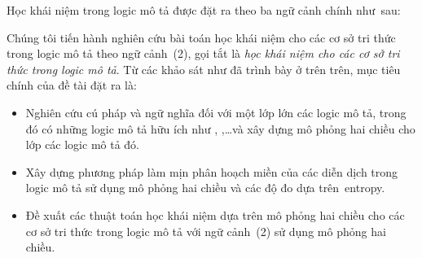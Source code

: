 Học khái niệm trong logic mô tả được đặt ra theo ba ngữ cảnh chính như~sau:\\[0.5ex]
%

Chúng tôi tiến hành nghiên cứu bài toán học khái niệm cho các cơ sở tri thức trong logic mô tả theo ngữ cảnh~(2), gọi tắt là {\em học khái niệm cho các cơ sở tri thức trong logic mô tả}. Từ các khảo sát như đã trình bày ở trên trên, mục tiêu chính của đề tài đặt ra là:
\begin{itemize}
	\item Nghiên cứu cú pháp và ngữ nghĩa đối với một lớp lớn các logic mô tả, trong đó có những logic mô tả hữu ích như \SHOIQ, \SROIQ,\ldots và xây dựng mô phỏng hai chiều cho lớp các logic mô tả đó.

	\item Xây dựng phương pháp làm mịn phân hoạch miền của các diễn dịch trong logic mô tả sử dụng mô phỏng hai chiều và các độ đo dựa trên~entropy.
	
	\item Đề xuất các thuật toán học khái niệm dựa trên mô phỏng hai chiều cho các cơ sở tri thức trong logic mô tả với ngữ cảnh~(2) sử dụng mô phỏng hai chiều.
\end{itemize}
\cleardoublepage
